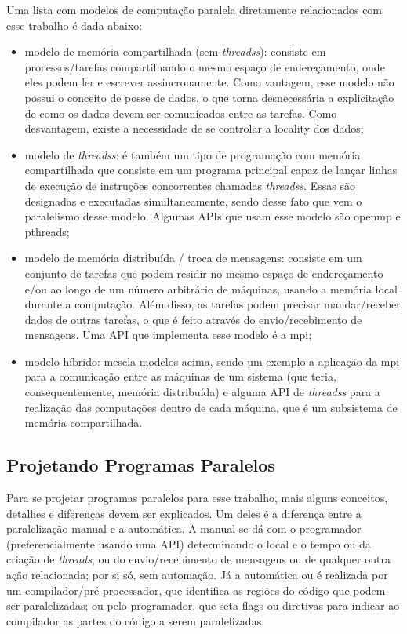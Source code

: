Uma lista com modelos de computação paralela diretamente relacionados
com esse trabalho é dada abaixo:
\begin{itemize}
	\item modelo de memória compartilhada (sem \textit{\glspl{threads}}):
	      consiste em processos/tarefas compartilhando o mesmo espaço de
	      endereçamento, onde eles podem ler e escrever assincronamente.
	      Como vantagem, esse modelo não possui o conceito de posse de
	      dados, o que torna desnecessária a explicitação de como os dados
	      devem ser comunicados entre as tarefas. Como desvantagem, existe
	      a necessidade de se controlar a \gls{locality} dos dados;
	\item modelo de \textit{\glspl{threads}}: é também um tipo de programação
	      com memória compartilhada que consiste em um programa principal
	      capaz de lançar linhas de execução de instruções concorrentes
	      chamadas \textit{\glspl{threads}}. Essas são designadas e
	      executadas simultaneamente, sendo desse fato que vem o
	      paralelismo desse modelo. Algumas \glspl{API}
	      que usam esse modelo são \acrfull{openmp}
	      e \acrfull{pthreads};
	\item modelo de memória distribuída / troca de mensagens:
	      consiste em um conjunto de tarefas que podem residir no mesmo
	      espaço de endereçamento e/ou ao longo de um número arbitrário de
	      máquinas, usando a memória local durante a computação. Além disso,
	      as tarefas podem precisar mandar/receber dados de outras tarefas, o que
	      é feito através do envio/recebimento de mensagens. Uma \acrshort{API} que
	      implementa esse modelo é a \acrfull{mpi};
	\item modelo híbrido: mescla modelos acima, sendo um exemplo a
	      aplicação da \acrshort{mpi} para a comunicação entre as máquinas de um
	      sistema (que teria, consequentemente, memória distribuída) e alguma 
	      \acrshort{API} de \textit{\glspl{threads}} para a realização das
	      computações dentro de cada máquina, que é um subsistema de
	      memória compartilhada.
\end{itemize}

\subsection{Projetando Programas Paralelos}

\label{subsec:parallel-design}

Para se projetar programas paralelos para esse trabalho, mais alguns
conceitos, detalhes e diferenças devem ser explicados. Um deles é a diferença
entre a paralelização manual e a automática. A manual
se dá com o programador (preferencialmente usando uma \acrshort{API})
determinando o local e o tempo ou da criação de \textit{threads}, ou
do envio/recebimento de mensagens ou de qualquer outra ação
relacionada; por si só, sem automação. Já a automática ou é realizada
por um compilador/pré-processador, que identifica as regiões do
código que podem ser paralelizadas; ou pelo programador, que seta
\glspl{flag} ou diretivas para indicar ao compilador as
partes do código a serem paralelizadas.

